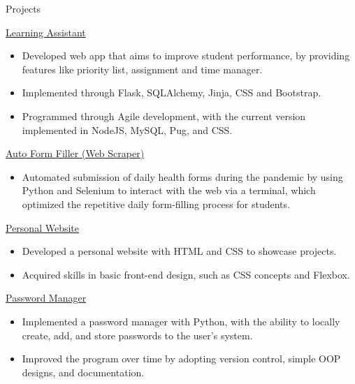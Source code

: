 \documentclass{article}
\newlength{\tabin}
\newlength{\secsep}
\newcommand{\lineunder}{\vspace*{-8pt} \\ \hspace*{-6pt} \hrulefill \\ \vspace*{-15pt}}
\newenvironment{tabbedsection}[1]{
  \begin{list}{}{
      \setlength{\itemsep}{0pt}
      \setlength{\labelsep}{0pt}
      \setlength{\labelwidth}{0pt}
      \setlength{\leftmargin}{\tabin}
      \setlength{\rightmargin}{\tabin}
      \setlength{\listparindent}{0pt}
      \setlength{\parsep}{0pt}
      \setlength{\parskip}{0pt}
      \setlength{\partopsep}{0pt}
      \setlength{\topsep}{#1}
    }
  \item[]
}{\end{list}}
\newenvironment{resume_section}[1]{
  \filbreak
  \vspace{2\secsep}
  \textsc{\large#1}
  \lineunder
  \begin{tabbedsection}{\secsep}
}{\end{tabbedsection}}
\newenvironment{resume_subsection}[2][]{
  \textbf{#2} \hfill {\footnotesize #1} \hspace{-5.1em}
  \begin{tabbedsection}{0.5\secsep}
}{\end{tabbedsection}}
\newenvironment{subitems}{
  \renewcommand{\labelitemi}{-}
  \begin{itemize}
      \setlength{\labelsep}{1em}
}{\end{itemize}}
\begin{document}
\begin{resume_section}{Projects}
  \begin{resume_subsection}[]{\href{https://github.com/TwinkletoesZen/Learning-Assistant}{Learning Assistant \faGithub}}
   \begin{subitems}
      \item Developed web app that aims to improve student performance, by providing features like priority list, assignment and time manager.
      \item Implemented through Flask, SQLAlchemy, Jinja, CSS and Bootstrap.
      \item Programmed through Agile development, with the current version implemented in NodeJS, MySQL, Pug, and CSS.
    \end{subitems}
  \end{resume_subsection}

  \begin{resume_subsection}[]{\href{https://github.com/TwinkletoesZen/Auto-HealthCheck-Completer}{Auto Form Filler (Web Scraper) \faGithub}}
    \begin{subitems}
      \item Automated submission of daily health forms during the pandemic by using Python and Selenium to interact with the web via a terminal, which optimized the repetitive daily form-filling process for students.
    \end{subitems}
  \end{resume_subsection}

  \begin{resume_subsection}[]{\href{https://github.com/TwinkletoesZen/Personal-Website}{Personal Website \faGithub}}
    \begin{subitems}
      \item Developed a personal website with HTML and CSS to showcase projects.
      \item Acquired skills in basic front-end design, such as CSS concepts and Flexbox.
    \end{subitems}
  \end{resume_subsection}

  \begin{resume_subsection}[]{\href{https://github.com/TwinkletoesZen/Password-Manager}{Password Manager \faGithub}}
    \begin{subitems}
      \item Implemented a password manager with Python, with the ability to locally create, add, and store passwords to the user's system.
      \item Improved the program over time by adopting version control, simple OOP designs, and documentation.
    \end{subitems}
  \end{resume_subsection}

\end{resume_section}
\end{document}
